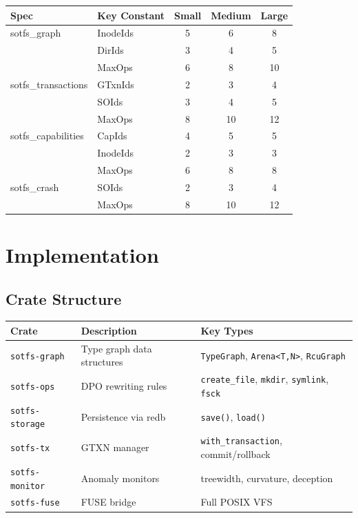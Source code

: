 \documentclass[11pt,a4paper,twoside]{report}
\theoremstyle{definition}
\begin{document}
\begin{center}\small
\begin{tabular}{llccc}
\toprule
\textbf{Spec} & \textbf{Key Constant} & \textbf{Small} & \textbf{Medium} & \textbf{Large} \\
\midrule
sotfs\_graph & InodeIds & 5 & 6 & 8 \\
             & DirIds   & 3 & 4 & 5 \\
             & MaxOps   & 6 & 8 & 10 \\
\midrule
sotfs\_transactions & GTxnIds & 2 & 3 & 4 \\
                    & SOIds   & 3 & 4 & 5 \\
                    & MaxOps  & 8 & 10 & 12 \\
\midrule
sotfs\_capabilities & CapIds    & 4 & 5 & 5 \\
                    & InodeIds  & 2 & 3 & 3 \\
                    & MaxOps    & 6 & 8 & 8 \\
\midrule
sotfs\_crash & SOIds  & 2 & 3 & 4 \\
             & MaxOps & 8 & 10 & 12 \\
\bottomrule
\end{tabular}
\end{center}

\part{Implementation}

\chapter{Crate Structure}

\begin{center}\small
\begin{tabular}{lll}
\toprule
\textbf{Crate} & \textbf{Description} & \textbf{Key Types} \\
\midrule
\texttt{sotfs-graph}   & Type graph data structures & \texttt{TypeGraph}, \texttt{Arena<T,N>}, \texttt{RcuGraph} \\
\texttt{sotfs-ops}     & DPO rewriting rules        & \texttt{create\_file}, \texttt{mkdir}, \texttt{symlink}, \texttt{fsck} \\
\texttt{sotfs-storage} & Persistence via redb        & \texttt{save()}, \texttt{load()} \\
\texttt{sotfs-tx}      & GTXN manager               & \texttt{with\_transaction}, commit/rollback \\
\texttt{sotfs-monitor} & Anomaly monitors            & treewidth, curvature, deception \\
\texttt{sotfs-fuse}    & FUSE bridge                 & Full POSIX VFS \\
\bottomrule
\end{tabular}
\end{center}
\end{document}
